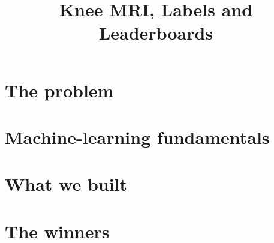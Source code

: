 \documentclass[11pt,a4paper,openany,twoside]{book}
\title{Knee MRI, Labels and Leaderboards}
\begin{document}
\frontmatter

{\hypersetup{linkcolor=ink}\tableofcontents}


\mainmatter
\part{The problem}





\part{Machine-learning fundamentals}



\part{What we built}






\part{The winners}




\appendix



\end{document}
